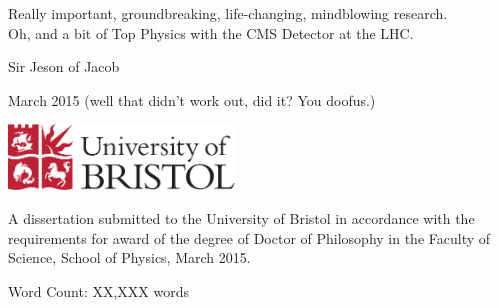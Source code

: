 \begin{titlepage}
	
	\begin{center}
		
		\vspace*{1cm}
		
		\Huge
		
		Really important, groundbreaking, life-changing, mindblowing research.\\
		Oh, and a bit of Top Physics with the CMS Detector at the LHC.

		\vspace{0.5cm}
		
		\large
		
		Sir Jeson of Jacob
		
		\vspace{0.5cm}
		
		March 2015 (well that didn't work out, did it? You doofus.)
		
		\vspace{0.5cm}
		
		\includegraphics[width=60mm]{Images/UnivShield}
		
		\vfill
		
		\normalsize
	\end{center}
	A dissertation submitted to the University of Bristol in accordance with the
	requirements for award of the degree of Doctor of Philosophy in the Faculty of
	Science, School of Physics, March 2015.

	\begin{flushright}
		Word Count: XX,XXX words
	\end{flushright}

\end{titlepage}